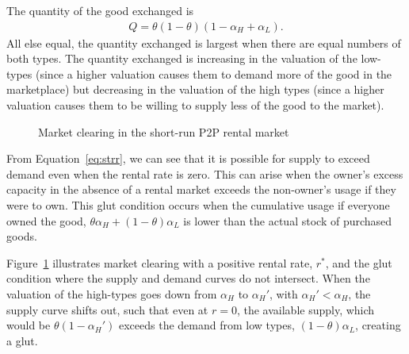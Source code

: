 \documentclass[11pt]{article}
\begin{document}
The quantity of the good exchanged is 
\begin{align} \label{eq:qty}
  Q = \theta (1-\theta) \left(1 - \alpha_H + \alpha_L\right).
\end{align} 
All else equal, the quantity exchanged is largest when there are equal numbers of both types.
The quantity exchanged is increasing in the valuation of the low-types (since a higher valuation causes them to demand more of the good in the marketplace) but decreasing in the valuation of the high types (since a higher valuation causes them to be willing to supply less of the good to the market). 
 
\newcommand*{\alphaH}{0.80}%
\newcommand*{\alphaL}{0.50}%
\newcommand*{\alphaHp}{0.40}
\pgfmathsetmacro{\r}{-1 + \alphaH + \alphaL}%
\pgfmathsetmacro{\Q}{\alphaL - \r/2}
\begin{figure} 
\caption{Market clearing in the short-run P2P rental market} 
\label{fig:market_clearing} 
\begin{center}
\end{center}
\end{figure} 

From Equation~\ref{eq:strr}, we can see that it is possible for supply to exceed demand even when the rental rate is zero. 
This can arise when the owner's excess capacity in the absence of a rental market exceeds the non-owner's usage if they were to own. 
This glut condition occurs when the cumulative usage if everyone owned the good, $\theta \alpha_H + (1-\theta)\alpha_L$ is lower than the actual stock of purchased goods. 

Figure~\ref{fig:market_clearing} illustrates market clearing with a positive rental rate, $r^*$, and the glut condition where the supply and demand curves do not intersect.
When the valuation of the high-types goes down from $\alpha_H$ to $\alpha_H'$, with $\alpha_H' < \alpha_H$, the supply curve shifts out, such that even at $r = 0$, the available supply, which would be $\theta (1-\alpha_H')$ exceeds the demand from low types, $(1-\theta)\alpha_L$, creating a glut.  
\end{document}

